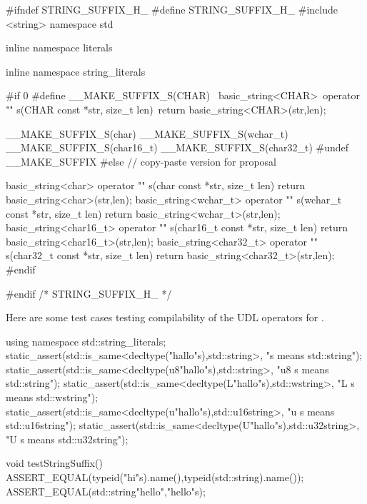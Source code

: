 \documentclass[ebook,11pt,article]{memoir}
\begin{document}
\begin{codeblock}
#ifndef STRING_SUFFIX_H_
#define STRING_SUFFIX_H_
#include <string>
namespace std{
inline namespace literals{
inline namespace string_literals{
#if 0
#define __MAKE_SUFFIX_S(CHAR) \
	basic_string<CHAR>\
operator "" s(CHAR const *str, size_t len){\
	return basic_string<CHAR>(str,len);\
}

__MAKE_SUFFIX_S(char)
__MAKE_SUFFIX_S(wchar_t)
__MAKE_SUFFIX_S(char16_t)
__MAKE_SUFFIX_S(char32_t)
#undef __MAKE_SUFFIX
#else // copy-paste version for proposal

basic_string<char>
operator "" s(char const *str, size_t len){
return basic_string<char>(str,len);
}
basic_string<wchar_t>
operator "" s(wchar_t const *str, size_t len){
return basic_string<wchar_t>(str,len);
}
basic_string<char16_t>
operator "" s(char16_t const *str, size_t len){
return basic_string<char16_t>(str,len);
}
basic_string<char32_t>
operator "" s(char32_t const *str, size_t len){
return basic_string<char32_t>(str,len);
}
#endif
}}}
#endif /* STRING_SUFFIX_H_ */
\end{codeblock}

Here are some test cases testing compilability of the UDL operators for .

\begin{codeblock}
using namespace std::string_literals;
static_assert(std::is_same<decltype("hallo"s),std::string>{},
              "s means std::string");
static_assert(std::is_same<decltype(u8"hallo"s),std::string>{},
              "u8 s means std::string");
static_assert(std::is_same<decltype(L"hallo"s),std::wstring>{},
              "L s means std::wstring");
static_assert(std::is_same<decltype(u"hallo"s),std::u16string>{},
              "u s means std::u16string");
static_assert(std::is_same<decltype(U"hallo"s),std::u32string>{},
              "U s means std::u32string");

void testStringSuffix(){
	ASSERT_EQUAL(typeid("hi"s).name(),typeid(std::string).name());
	ASSERT_EQUAL(std::string{"hello"},"hello"s);
}
\end{codeblock}

\end{document}
